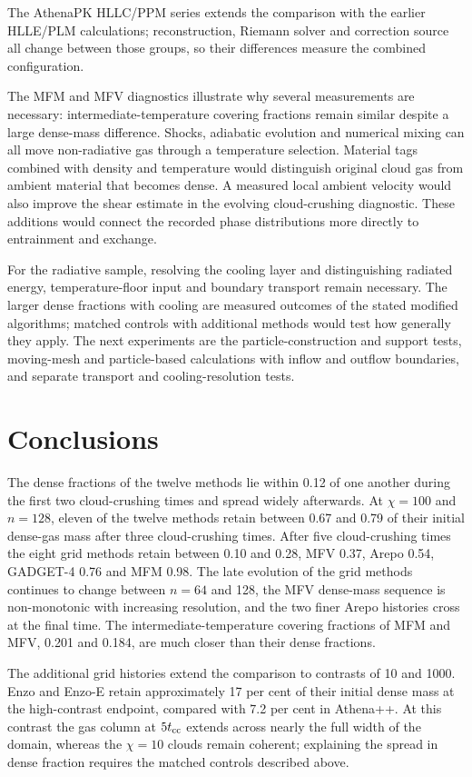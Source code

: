 \documentclass[twocolumn,apj,numberedappendix]{openjournal}
\begin{document}
The AthenaPK HLLC/PPM series extends the comparison with the earlier HLLE/PLM calculations; reconstruction, Riemann solver and correction source all change between those groups, so their differences measure the combined configuration.

The MFM and MFV diagnostics illustrate why several measurements are necessary: intermediate-temperature covering fractions remain similar despite a large dense-mass difference. Shocks, adiabatic evolution and numerical mixing can all move non-radiative gas through a temperature selection. Material tags combined with density and temperature would distinguish original cloud gas from ambient material that becomes dense. A measured local ambient velocity would also improve the shear estimate in the evolving cloud-crushing diagnostic. These additions would connect the recorded phase distributions more directly to entrainment and exchange.

For the radiative sample, resolving the cooling layer and distinguishing radiated energy, temperature-floor input and boundary transport remain necessary. The larger dense fractions with cooling are measured outcomes of the stated modified algorithms; matched controls with additional methods would test how generally they apply. The next experiments are the particle-construction and support tests, moving-mesh and particle-based calculations with inflow and outflow boundaries, and separate transport and cooling-resolution tests.

\section{Conclusions}
The dense fractions of the twelve methods lie within 0.12 of one another during the first two cloud-crushing times and spread widely afterwards. At $\chi=100$ and $n=128$, eleven of the twelve methods retain between 0.67 and 0.79 of their initial dense-gas mass after three cloud-crushing times. After five cloud-crushing times the eight grid methods retain between 0.10 and 0.28, MFV 0.37, Arepo 0.54, GADGET-4 0.76 and MFM 0.98. The late evolution of the grid methods continues to change between $n=64$ and 128, the MFV dense-mass sequence is non-monotonic with increasing resolution, and the two finer Arepo histories cross at the final time. The intermediate-temperature covering fractions of MFM and MFV, 0.201 and 0.184, are much closer than their dense fractions.

The additional grid histories extend the comparison to contrasts of 10 and 1000. Enzo and Enzo-E retain approximately 17 per cent of their initial dense mass at the high-contrast endpoint, compared with 7.2 per cent in Athena++. At this contrast the gas column at $5t_{\rm cc}$ extends across nearly the full width of the domain, whereas the $\chi=10$ clouds remain coherent; explaining the spread in dense fraction requires the matched controls described above.
\end{document}
